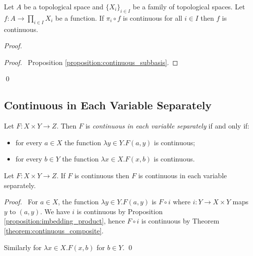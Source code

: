 \begin{theorem}
    \label{theorem:product_continuous}
        Let $A$ be a topological space and $\{ X_i \}_{i \in I}$ be a family of topological spaces. Let $f : A \rightarrow \prod_{i \in I} X_i$ be a function.
        If $\pi_i \circ f$ is continuous for all $i \in I$ then $f$ is continuous.
\end{theorem}

\begin{proof}
    \pf
    \qedstep
    \begin{proof}
        \pf\ Proposition \ref{proposition:continuous_subbasis}.
    \end{proof}
    \qed
\end{proof}

\subsection{Continuous in Each Variable Separately}

\begin{definition}
    Let $F : X \times Y \rightarrow Z$. Then $F$ is \emph{continuous in each
    variable separately} if and only if:
    \begin{itemize}
        \item for every $a \in X$ the function $\lambda y \in Y. F(a,y)$ is continuous;
        \item for every $b \in Y$ the function $\lambda x \in X. F(x,b)$ is continuous.
    \end{itemize}
\end{definition}

\begin{proposition}
    Let $F : X \times Y \rightarrow Z$. If $F$ is continuous then $F$ is continuous in each
    variable separately.
\end{proposition}

\begin{proof}
    \pf\ For $a \in X$, the function $\lambda y \in Y. F(a,y)$ is $F \circ i$ where $i : Y \rightarrow X \times Y$ maps $y$ to $(a,y)$.
    We have $i$ is continuous by Proposition \ref{proposition:imbedding_product}, hence $F \circ i$ is continuous by Theorem \ref{theorem:continuous_composite}.

    Similarly for $\lambda x \in X. F(x,b)$ for $b \in Y$. \qed
\end{proof}

